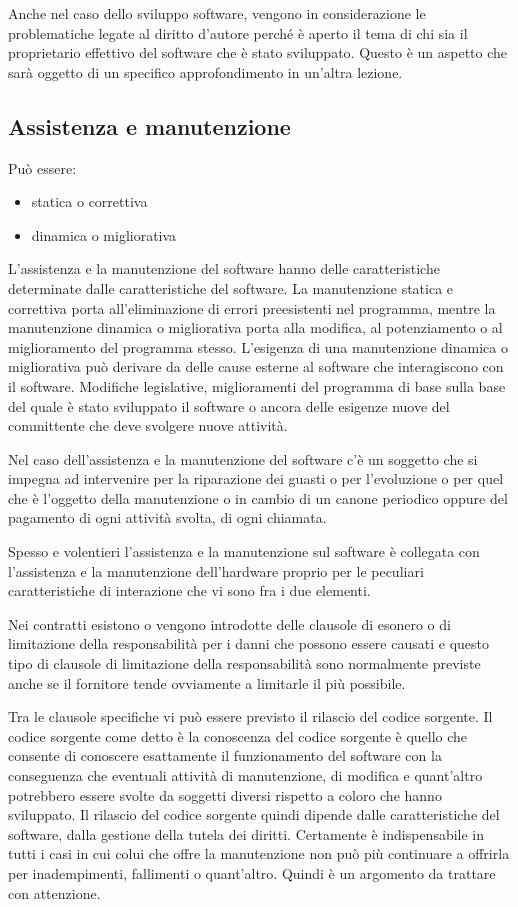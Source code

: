 \begin{itemize}
Anche nel caso dello sviluppo software, vengono in considerazione le problematiche legate al diritto d'autore perché è aperto il tema di chi sia il proprietario effettivo del software che è stato sviluppato. Questo è un aspetto che sarà oggetto di un specifico approfondimento in un'altra lezione. 

\subsection{Assistenza e manutenzione}
Può essere:

\begin{itemize}
    \item statica o correttiva
    \item dinamica o migliorativa
\end{itemize}

L'assistenza e la manutenzione del software hanno delle caratteristiche determinate dalle caratteristiche del software. La manutenzione statica e correttiva porta all'eliminazione di errori preesistenti nel programma, mentre la manutenzione dinamica o migliorativa porta alla modifica, al potenziamento o al miglioramento del programma stesso. L'esigenza di una manutenzione dinamica o migliorativa può derivare da delle cause esterne al software che interagiscono con il software. Modifiche legislative, miglioramenti del programma di base sulla base del quale è stato sviluppato il software o ancora delle esigenze nuove del committente che deve svolgere nuove attività. 

Nel caso dell'assistenza e la manutenzione del software c'è un soggetto che si impegna ad intervenire per la riparazione dei guasti o per l'evoluzione o per quel che è l'oggetto della manutenzione o in cambio di un canone periodico oppure del pagamento di ogni attività svolta, di ogni chiamata. 

Spesso e volentieri l'assistenza e la manutenzione sul software è collegata con l'assistenza e la manutenzione dell'hardware proprio per le peculiari caratteristiche di interazione che vi sono fra i due elementi. 

Nei contratti esistono o vengono introdotte delle clausole di esonero o di limitazione della responsabilità per i danni che possono essere causati e questo tipo di clausole di limitazione della responsabilità sono normalmente previste anche se il fornitore tende ovviamente a limitarle il più possibile. 

Tra le clausole specifiche vi può essere previsto il rilascio del codice sorgente. Il codice sorgente come detto è la conoscenza del codice sorgente è quello che consente di conoscere esattamente il funzionamento del software con la conseguenza che eventuali attività di manutenzione, di modifica e quant'altro potrebbero essere svolte da soggetti diversi rispetto a coloro che hanno sviluppato. Il rilascio del codice sorgente quindi dipende dalle caratteristiche del software, dalla gestione della tutela dei diritti. Certamente è indispensabile in tutti i casi in cui colui che offre la manutenzione non può più continuare a offrirla per inadempimenti, fallimenti o quant'altro. Quindi è un argomento da trattare con attenzione. 


\end{itemize}
